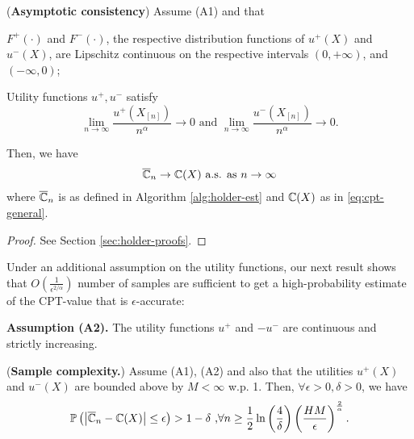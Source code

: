 \begin{proposition}(\textbf{Asymptotic consistency})
\label{prop:holder-asymptotic}
Assume (A1) and that \\
\begin{inparaenum}[\bfseries (i)]
\item $F^+(\cdot)$ and $F^-(\cdot)$, the respective distribution functions of $u^+(X)$ and $u^-(X)$, 
are Lipschitz continuous on the respective intervals $(0,+\infty)$, and 
$(-\infty, 0)$; \\
\item Utility functions $u^+, u^-$ satisfy 
$$\lim\limits_{n\rightarrow\infty}\frac{u^+(X_{[n]})}{n^{\alpha}}\rightarrow 0 \text{ and }\lim\limits_{n\rightarrow\infty}\frac{u^-(X_{[n]})}{n^{\alpha}}\rightarrow 0.$$
\end{inparaenum}
Then, we have 
\begin{align}
\overline {\mathbb{C}}_n
\rightarrow
\mathbb{C}(X)
 \text{   a.s. as } n\rightarrow \infty
\end{align}
where $\overline {\mathbb{C}}_n$ is as defined in Algorithm \ref{alg:holder-est} and $\mathbb{C}(X)$ as in \eqref{eq:cpt-general}.
\end{proposition}
\begin{proof}
See Section \ref{sec:holder-proofs}. 
\end{proof}
Under an additional assumption on the utility functions,
our next result shows that $O\left(\frac{1}{\epsilon^{2/\alpha}}\right)$ number of samples are sufficient to get a
high-probability estimate of the CPT-value that is $\epsilon$-accurate:

\noindent\textbf{Assumption (A2).}  The utility functions $u^+$ and $-u^-$ are continuous and strictly increasing.


\begin{proposition}(\textbf{Sample complexity.})
\label{prop:holder-dkw}
Assume (A1), (A2) and also that the utilities $u^+(X)$ and $u^-(X)$ are bounded above by $M<\infty$ w.p. 1. Then, $\forall \epsilon >0, \delta >0$, we have
$$
\mathbb{P}\left( \left |\overline {\mathbb{C}}_n- \mathbb{C}(X) \right| \leq  \epsilon  \right) >1- \delta\text{     ,} \forall n \geq \frac{1}{2}\ln\left(\frac{4}{\delta}\right)
\left(\frac{HM}{\epsilon}\right)^{\frac{2}{\alpha}}.$$
\end{proposition}

